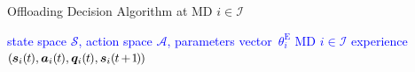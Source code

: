 \documentclass[12pt,draftclsnofoot,onecolumn]{IEEEtran}
\newcommand{\rev}[1]{{\color{blue}#1}} %
\newcommand{\rev}[1]{#1}
\newenvironment{my}[2]%
{\begin{list}{}%
{\setlength{\rightmargin}{#1}\setlength{\leftmargin}{#2}}%


 \item[]{}

} {\end{list}}
\begin{document}
\begin{enumerate}
\begin{my}{0.5cm}{0.5cm}	
\rev{\begin{minipage}[b]{0.87\textwidth} 
	\begin{algorithm}[H] \caption{Offloading Decision Algorithm at MD $i \in \mathcal{I}$}\label{alg:cap2} \centering 
		\begin{algorithmic}[1] 		\renewcommand{\algorithmicrequire}{\textbf{\textcolor{blue}{Input:}}} 
			\renewcommand{\algorithmicensure}{\textbf{\textcolor{blue}{Output:}}}
			\Require \textcolor{blue}{ state space $\mathcal{S}$, action space $\mathcal{A}$, parameters vector~$\theta_i^{\text{E}}$}
			\Ensure \textcolor{blue}{MD $i \in \mathcal{I}$ experience  \textcolor{blue}{ $(\hspace{-0.2mm}\boldsymbol{s}_i(\hspace{-0.2mm}t\hspace{-0.2mm}), \boldsymbol{a}_i(\hspace{-0.2mm}t\hspace{-0.2mm}), \boldsymbol{q}_i(\hspace{-0.2mm}t\hspace{-0.2mm}), \boldsymbol{s}_i(\hspace{-0.2mm}t\hspace{-0.3mm}+\hspace{-0.3mm}\hspace{-0.2mm}1\hspace{-0.2mm}\hspace{-0.2mm})\hspace{-0.2mm})$}}
	\end{algorithmic} 
\end{algorithm} 
\end{minipage}
\vspace{5mm}

}
\end{my}
\end{enumerate}
\end{document}
